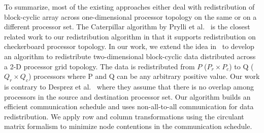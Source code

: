 \documentclass[letterpaper]{llncs}
\begin{document}
To summarize, most of the existing approaches either deal with redistribution of
block-cyclic array across one-dimensional processor topology on the same or
on a different processor set. The Caterpillar algorithm by Prylli et al.~\cite{prylli}
is the closest related work to our redistribution algorithm in that it supports
redistribution on checkerboard processor topology.
In our work,
we extend the idea in~\cite{Lim97}\cite{park} to develop an algorithm to redistribute two-dimensional block-cyclic data
distributed across a 2-D processor grid topology.
The data is redistributed from $P$ ($P_r \times P_c$) to Q ($Q_r \times Q_c$) processors where P and Q can be any  arbitrary positive value.
Our work is contrary to  Desprez et al.~\cite{desprez98scheduling} where they assume that there is no overlap among processors in the
source and destination processor set. Our algorithm builds an efficient communication schedule and uses non-all-to-all communication
for data redistribution. 
We apply row and column transformations using the
circulant matrix formalism to minimize
node contentions in the communication schedule.
\end{document}
